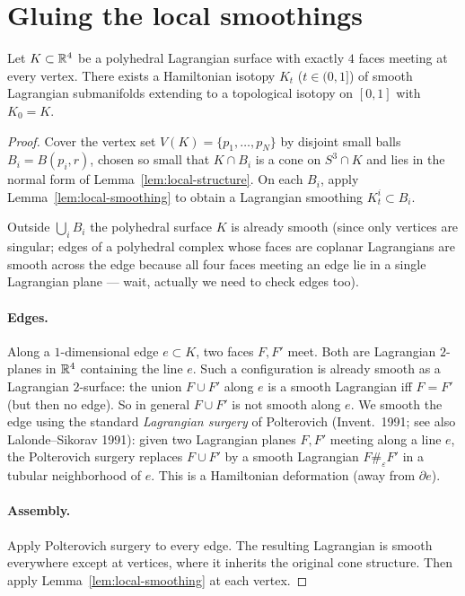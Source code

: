 \section{Gluing the local smoothings}

\begin{theorem}\label{thm:main}
Let $K\subset\mathbb{R}^4$ be a polyhedral Lagrangian surface with exactly $4$ faces meeting at every vertex. There exists a Hamiltonian isotopy $K_t$ ($t\in(0,1]$) of smooth Lagrangian submanifolds extending to a topological isotopy on $[0,1]$ with $K_0=K$.
\end{theorem}

\begin{proof}
Cover the vertex set $V(K)=\{p_1,\ldots,p_N\}$ by disjoint small balls $B_i=B(p_i,r)$, chosen so small that $K\cap B_i$ is a cone on $S^3\cap K$ and lies in the normal form of Lemma~\ref{lem:local-structure}. On each $B_i$, apply Lemma~\ref{lem:local-smoothing} to obtain a Lagrangian smoothing $K^i_t\subset B_i$.

Outside $\bigcup_i B_i$ the polyhedral surface $K$ is already smooth (since only vertices are singular; edges of a polyhedral complex whose faces are coplanar Lagrangians are smooth across the edge because all four faces meeting an edge lie in a single Lagrangian plane — wait, actually we need to check edges too).

\paragraph{Edges.} Along a $1$-dimensional edge $e\subset K$, two faces $F,F'$ meet. Both are Lagrangian $2$-planes in $\mathbb{R}^4$ containing the line $e$. Such a configuration is already smooth as a Lagrangian $2$-surface: the union $F\cup F'$ along $e$ is a smooth Lagrangian iff $F=F'$ (but then no edge). So in general $F\cup F'$ is not smooth along $e$. We smooth the edge using the standard \emph{Lagrangian surgery} of Polterovich (Invent.\ 1991; see also Lalonde--Sikorav 1991): given two Lagrangian planes $F,F'$ meeting along a line $e$, the Polterovich surgery replaces $F\cup F'$ by a smooth Lagrangian $F\#_\varepsilon F'$ in a tubular neighborhood of $e$. This is a Hamiltonian deformation (away from $\partial e$).

\paragraph{Assembly.} Apply Polterovich surgery to every edge. The resulting Lagrangian is smooth everywhere except at vertices, where it inherits the original cone structure. Then apply Lemma~\ref{lem:local-smoothing} at each vertex.


\end{proof}
